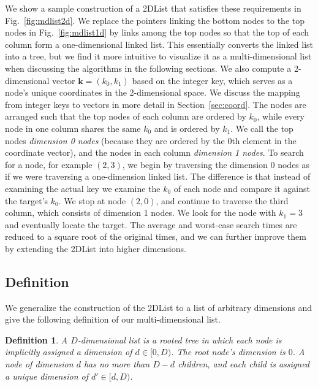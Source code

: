 \documentclass[10pt,journal,letter,compsoc]{IEEEtran}
\newtheorem{definition}{Definition}
\begin{document}
We show a sample construction of a 2DList that satisfies these requirements in Fig.~\ref{fig:mdlist2d}.
We replace the pointers linking the bottom nodes to the top nodes in Fig.~\ref{fig:mdlist1d} by links among the top nodes so that the top of each column form a one-dimensional linked list.
This essentially converts the linked list into a tree, but we find it more intuitive to visualize it as a multi-dimensional list when discussing the algorithms in the following sections.
We also compute a 2-dimensional vector $\mathbf{k}=(k_0,k_1)$ based on the integer key, which serves as a node's unique coordinates in the 2-dimensional space.
We discuss the mapping from integer keys to vectors in more detail in Section~\ref{sec:coord}.
The nodes are arranged such that the top nodes of each column are ordered by $k_0$, while every node in one column shares the same $k_0$ and is ordered by $k_1$.
We call the top nodes \emph{dimension 0 nodes} (because they are ordered by the 0th element in the coordinate vector), and the nodes in each column \emph{dimension 1 nodes}.
To search for a node, for example $(2,3)$, we begin by traversing the dimension 0 nodes as if we were traversing a one-dimension linked list.
The difference is that instead of examining the actual key we examine the $k_0$ of each node and compare it against the target's $k_0$.
We stop at node $(2,0)$, and continue to traverse the third column, which consists of dimension 1 nodes. 
We look for the node with $k_1 = 3$ and eventually locate the target.
The average and worst-case search times are reduced to a square root of the original times, and we can further improve them by extending the 2DList into higher dimensions.

\vspace{-0.05in}
\theoremstyle{definition}
\subsection{Definition}
We generalize the construction of the 2DList to a list of arbitrary dimensions and give the following definition of our multi-dimensional list.
\vspace{-0.05in}
\begin{definition}
\label{def:mdlist}
A $D$-dimensional list is a rooted tree in which each node is implicitly assigned a dimension of $d \in [0,D)$. The root node's dimension is $0$. A node of dimension $d$ has no more than $D-d$ children, and each child is assigned a unique dimension of $d' \in [d,D)$. 
\end{definition}
\vspace{-0.05in}
\end{document}
